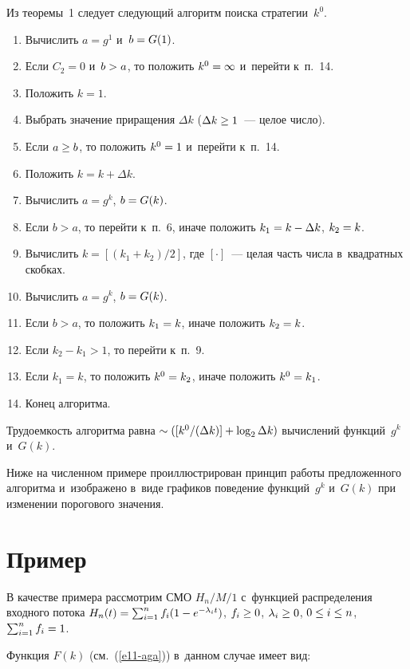 \begin{multicols}{2}
  \smallskip
  
  Из теоремы~1 следует следующий алгоритм поиска стратегии~$k^0$.
  \begin{enumerate}[1.]
\item Вычислить $a=g^1$ и~$b\hm=G(1)$.
\item Если $C_2=0$ и~$b\hm>a$, то положить $k^0\hm=\infty$ и~перейти 
к~п.~14.
\item Положить $k=1$.
\item Выбрать значение приращения $\Delta k$ ($\Delta k\hm\geq 1$~--- целое 
число).
\item Если $a\hm\geq b$, то положить $k^0\hm=1$ и~перейти к~п.~14.
\item Положить $k=k+\Delta k$.
\item Вычислить $a=g^k$, $b\hm= G(k)$. 
\item Если $b>a$, то перейти к~п.~6, иначе положить $k_1\hm= k\hm - \Delta k$, 
$k_2\hm=k$.
\item Вычислить $k=[(k_1+k_2)/2]$, где $[\cdot ]$~--- целая часть числа 
в~квадратных скобках.
\item Вычислить $a=g^k$, $b\hm= G(k)$.
\item Если $b>a$, то положить $k_1\hm=k$, иначе положить $k_2\hm=k$.
\item Если $k_2-k_1>1$, то перейти к~п.~9.
\item Если $k_1=k$, то положить $k^0\hm= k_2$, иначе положить $k^0\hm= k_1$. 
\item Конец алгоритма.
\end{enumerate}

\smallskip

  Трудоемкость алгоритма равна $\sim ([k^0/(\Delta k)]\hm+ \log_2\Delta k)$  
вычислений функций~$g^k$ и~$G(k)$.
  
  Ниже на численном примере проиллюстрирован принцип работы 
предложенного алгоритма и~изображено в~виде графиков поведение 
функций~$g^k$ и~$G(k)$ при изменении порогового значения. 
  
  \section{Пример}
  
  В качестве примера рассмотрим СМО $H_n/M/1$ с~функцией распределения 
входного потока 
  $H_n(t)\hm= \sum\nolimits_{i=1}^n f_i (1\hm- e^{-\lambda_i t})$, $f_i\hm\geq 0$, 
$\lambda_i\hm\geq 0$, $0\hm\leq i\hm\leq n$, $\sum\nolimits^n_{i=1} f_i\hm=1$. 
  
  Функция $F(k)$ (см.~(\ref{e11-aga})) в~данном случае имеет вид:
  

\end{multicols}
